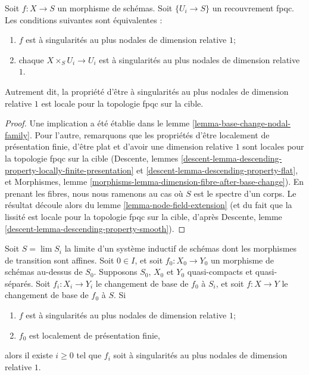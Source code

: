 \begin{lemma}
\label{lemma-nodal-family-fpqc-local-target}
Soit $f : X \to S$ un morphisme de schémas. Soit $\{U_i \to S\}$ un recouvrement fpqc. Les conditions suivantes sont équivalentes : \begin{enumerate} \item $f$ est à singularités au plus nodales de dimension relative $1$; \item chaque $X \times_S U_i \to U_i$ est à singularités au plus nodales de dimension relative $1$. \end{enumerate} Autrement dit, la propriété d'être à singularités au plus nodales de dimension relative $1$ est locale pour la topologie fpqc sur la cible.
\end{lemma}

\begin{proof}
Une implication a été établie dans le lemme \ref{lemma-base-change-nodal-family}. Pour l'autre, remarquons que les propriétés d'être localement de présentation finie, d'être plat et d'avoir une dimension relative $1$ sont locales pour la topologie fpqc sur la cible (Descente, lemmes \ref{descent-lemma-descending-property-locally-finite-presentation} et \ref{descent-lemma-descending-property-flat}, et Morphismes, lemme \ref{morphisms-lemma-dimension-fibre-after-base-change}). En prenant les fibres, nous nous ramenons au cas où $S$ est le spectre d'un corps. Le résultat découle alors du lemme \ref{lemma-node-field-extension} (et du fait que la lissité est locale pour la topologie fpqc sur la cible, d'après Descente, lemme \ref{descent-lemma-descending-property-smooth}).
\end{proof}

\begin{lemma}
\label{lemma-descend-nodal-family}
Soit $S = \lim S_i$ la limite d'un système inductif de schémas dont les morphismes de transition sont affines. Soit $0 \in I$, et soit $f_0 : X_0 \to Y_0$ un morphisme de schémas au-dessus de $S_0$. Supposons $S_0$, $X_0$ et $Y_0$ quasi-compacts et quasi-séparés. Soit $f_i : X_i \to Y_i$ le changement de base de $f_0$ à $S_i$, et soit $f : X \to Y$ le changement de base de $f_0$ à $S$. Si \begin{enumerate} \item $f$ est à singularités au plus nodales de dimension relative $1$; \item $f_0$ est localement de présentation finie, \end{enumerate} alors il existe $i \geq 0$ tel que $f_i$ soit à singularités au plus nodales de dimension relative $1$.
\end{lemma}

